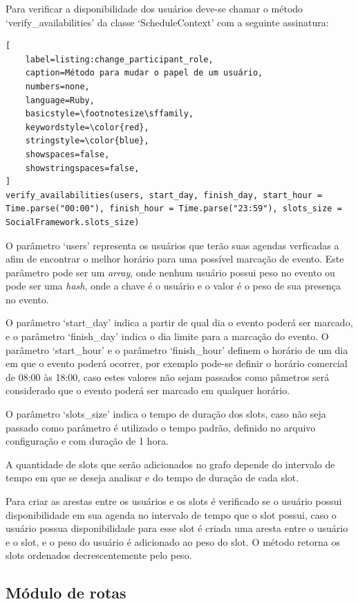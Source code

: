 Para verificar a disponibilidade dos usuários deve-se chamar o método `verify\_availabilities' da classe `ScheduleContext' com a seguinte assinatura:

\begin{lstlisting}[
    label=listing:change_participant_role,
    caption=Método para mudar o papel de um usuário,
    numbers=none,
    language=Ruby,
    basicstyle=\footnotesize\sffamily,
    keywordstyle=\color{red},
    stringstyle=\color{blue},
    showspaces=false,
    showstringspaces=false,
]
verify_availabilities(users, start_day, finish_day, start_hour = Time.parse("00:00"), finish_hour = Time.parse("23:59"), slots_size = SocialFramework.slots_size)
\end{lstlisting}

O parâmetro `users' representa os usuários que terão suas agendas verficadas a afim de encontrar o melhor horário para uma possível marcação de evento. Este parâmetro pode ser um \textit{array}, onde nenhum usuário possui peso no evento ou pode ser uma \textit{hash}, onde a chave é o usuário e o valor é o peso de sua presença no evento.

O parâmetro `start\_day' indica a partir de qual dia o evento poderá ser marcado, e o parâmetro `finish\_day' indica o dia limite para a marcação do evento. O parâmetro `start\_hour' e o parâmetro `finish\_hour' definem o horário de um dia em que o evento poderá ocorrer, por exemplo pode-se definir o horário comercial de 08:00 às 18:00, caso estes valores não sejam passados como pâmetros será considerado que o evento poderá ser marcado em qualquer horário.

O parâmetro `slots\_size' indica o tempo de duração dos slots, caso não seja passado como parâmetro é utilizado o tempo padrão, definido no arquivo configuração e com duração de 1 hora.

A quantidade de slots que serão adicionados no grafo depende do intervalo de tempo em que se deseja analisar e do tempo de duração de cada slot.

Para criar as arestas entre os usuários e os slots é verificado se o usuário possui disponibilidade em sua agenda no intervalo de tempo que o slot possui, caso o usuário possua disponibilidade para esse slot é criada uma aresta entre o usuário e o slot, e o peso do usuário é adicionado ao peso do slot. O método retorna os slots ordenados decrescentemente pelo peso.

\subsection{Módulo de rotas}

